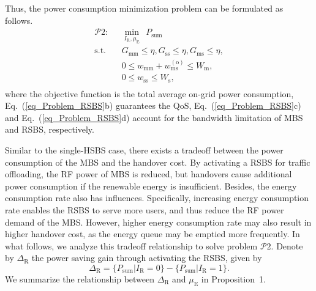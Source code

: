 \documentclass[12pt, draftclsnofoot,onecolumn]{IEEEtran}
\begin{document}
Thus, the power consumption minimization problem can be formulated as follows.
\begin{subequations}\label{eq_Problem_RSBS}
    \begin{align}
    \mathcal{P}2:~~~& \min\limits_{I_\mathrm{R},\mu_\mathrm{E}} ~~ P_\mathrm{sum} \\
    \mbox{s.t.}~~~ & G_\mathrm{mm}\leq \eta, G_\mathrm{ss}\leq \eta, G_\mathrm{ms} \leq \eta, \\
                & 0 \leq w_\mathrm{mm} + w_\mathrm{ms}^{(\mathrm{o})} \leq W_\mathrm{m}, \\
                & 0\leq w_\mathrm{ss} \leq W_\mathrm{s},\\
    \end{align}
\end{subequations}
where the objective function is the total average on-grid power consumption, Eq.~(\ref{eq_Problem_RSBS}b) guarantees the QoS, Eq.~(\ref{eq_Problem_RSBS}c) and Eq.~(\ref{eq_Problem_RSBS}d) account for the bandwidth limitation of MBS and RSBS, respectively.

Similar to the single-HSBS case, there exists a tradeoff between the power consumption of the MBS and the handover cost.
By activating a RSBS for traffic offloading, the RF power of MBS is reduced, but handovers cause additional power consumption if the renewable energy is insufficient.
Besides, the energy consumption rate also has influences.
Specifically, increasing energy consumption rate enables the RSBS to serve more users, and thus reduce the RF power demand of the MBS.
However, higher energy consumption rate may also result in higher handover cost, as the energy queue may be emptied more frequently.
In what follows, we analyze this tradeoff relationship to solve problem $\mathcal{P}2$.
Denote by $\Delta_\mathrm{R}$ the power saving gain through activating the RSBS, given by
\begin{equation}\label{eq_gain_RSBS_definition}
    \Delta_\mathrm{R} = \{P_\mathrm{sum}|I_\mathrm{R}=0\} - \{P_\mathrm{sum}|I_\mathrm{R}=1\}.
\end{equation}
We summarize the relationship between $\Delta_\mathrm{R}$ and $\mu_\mathrm{E}$ in Proposition~1.
\end{document}
